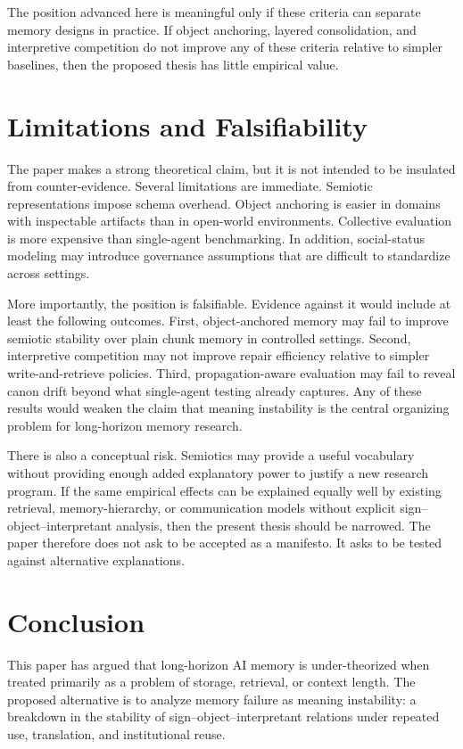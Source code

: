 \documentclass[10pt,twocolumn]{article}
\begin{document}
The position advanced here is meaningful only if these criteria can separate memory designs in practice. If object anchoring, layered consolidation, and interpretive competition do not improve any of these criteria relative to simpler baselines, then the proposed thesis has little empirical value.

\section{Limitations and Falsifiability}
\label{sec:limitations}

The paper makes a strong theoretical claim, but it is not intended to be insulated from counter-evidence. Several limitations are immediate. Semiotic representations impose schema overhead. Object anchoring is easier in domains with inspectable artifacts than in open-world environments. Collective evaluation is more expensive than single-agent benchmarking. In addition, social-status modeling may introduce governance assumptions that are difficult to standardize across settings.

More importantly, the position is falsifiable. Evidence against it would include at least the following outcomes. First, object-anchored memory may fail to improve semiotic stability over plain chunk memory in controlled settings. Second, interpretive competition may not improve repair efficiency relative to simpler write-and-retrieve policies. Third, propagation-aware evaluation may fail to reveal canon drift beyond what single-agent testing already captures. Any of these results would weaken the claim that meaning instability is the central organizing problem for long-horizon memory research.

There is also a conceptual risk. Semiotics may provide a useful vocabulary without providing enough added explanatory power to justify a new research program. If the same empirical effects can be explained equally well by existing retrieval, memory-hierarchy, or communication models without explicit sign--object--interpretant analysis, then the present thesis should be narrowed. The paper therefore does not ask to be accepted as a manifesto. It asks to be tested against alternative explanations.

\section{Conclusion}
\label{sec:conclusion}

This paper has argued that long-horizon AI memory is under-theorized when treated primarily as a problem of storage, retrieval, or context length. The proposed alternative is to analyze memory failure as meaning instability: a breakdown in the stability of sign--object--interpretant relations under repeated use, translation, and institutional reuse.
\end{document}
